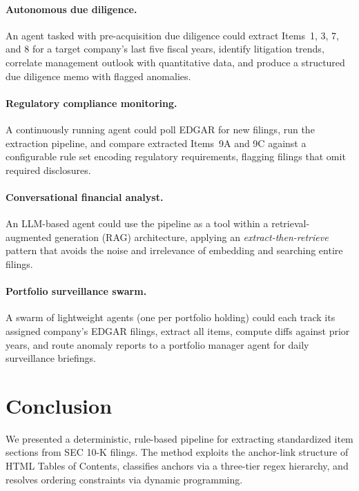 \documentclass[11pt,a4paper]{article}
\begin{document}
\paragraph{Autonomous due diligence.} An agent tasked with pre-acquisition due diligence could extract Items~1, 3, 7, and 8 for a target company's last five fiscal years, identify litigation trends, correlate management outlook with quantitative data, and produce a structured due diligence memo with flagged anomalies.

\paragraph{Regulatory compliance monitoring.} A continuously running agent could poll EDGAR for new filings, run the extraction pipeline, and compare extracted Items~9A and 9C against a configurable rule set encoding regulatory requirements, flagging filings that omit required disclosures.

\paragraph{Conversational financial analyst.} An LLM-based agent could use the pipeline as a tool within a retrieval-augmented generation (RAG) architecture, applying an \emph{extract-then-retrieve} pattern that avoids the noise and irrelevance of embedding and searching entire filings.

\paragraph{Portfolio surveillance swarm.} A swarm of lightweight agents (one per portfolio holding) could each track its assigned company's EDGAR filings, extract all items, compute diffs against prior years, and route anomaly reports to a portfolio manager agent for daily surveillance briefings.


\section{Conclusion}

We presented a deterministic, rule-based pipeline for extracting standardized item sections from SEC 10-K filings. The method exploits the anchor-link structure of HTML Tables of Contents, classifies anchors via a three-tier regex hierarchy, and resolves ordering constraints via dynamic programming.
\end{document}
